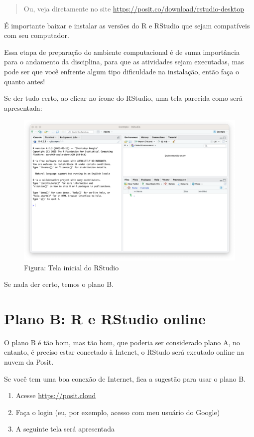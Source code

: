 \documentclass[
]{book}
\begin{document}
\begin{quote}
Ou, veja diretamente no site \url{https://posit.co/download/rstudio-desktop}
\end{quote}

É importante baixar e instalar as versões do R e RStudio que sejam compatíveis com seu computador.

Essa etapa de preparação do ambiente computacional é de suma importância para o andamento da disciplina, para que as atividades sejam executadas, mas pode ser que você enfrente algum tipo dificuldade na instalação, então faça o quanto antes!

Se der tudo certo, ao clicar no ícone do RStudio, uma tela parecida como será apresentada:

\begin{figure}
\centering
\includegraphics{telaRStudio.png}
\caption{ Figura: Tela inicial do RStudio}
\end{figure}

Se nada der certo, temos o plano B.

\section{Plano B: R e RStudio online}\label{plano-b-r-e-rstudio-online}

O plano B é tão bom, mas tão bom, que poderia ser considerado plano A, no entanto, é preciso estar conectado à Intenet, o RStudo será excutado online na nuvem da Posit.

Se você tem uma boa conexão de Internet, fica a sugestão para usar o plano B.

\begin{enumerate}
\def\labelenumi{\arabic{enumi}.}
\item
  Acesse \url{https://posit.cloud}
\item
  Faça o login (eu, por exemplo, acesso com meu usuário do Google)
\item
  A seguinte tela será apresentada
\end{enumerate}
\end{document}
